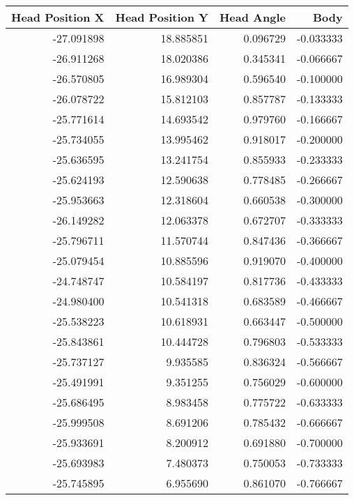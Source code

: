 \begin{tabular}{rrrr}
\toprule
 Head Position X &  Head Position Y &  Head Angle &       Body \\
\midrule
      -27.091898 &        18.885851 &    0.096729 &  -0.033333 \\
      -26.911268 &        18.020386 &    0.345341 &  -0.066667 \\
      -26.570805 &        16.989304 &    0.596540 &  -0.100000 \\
      -26.078722 &        15.812103 &    0.857787 &  -0.133333 \\
      -25.771614 &        14.693542 &    0.979760 &  -0.166667 \\
      -25.734055 &        13.995462 &    0.918017 &  -0.200000 \\
      -25.636595 &        13.241754 &    0.855933 &  -0.233333 \\
      -25.624193 &        12.590638 &    0.778485 &  -0.266667 \\
      -25.953663 &        12.318604 &    0.660538 &  -0.300000 \\
      -26.149282 &        12.063378 &    0.672707 &  -0.333333 \\
      -25.796711 &        11.570744 &    0.847436 &  -0.366667 \\
      -25.079454 &        10.885596 &    0.919070 &  -0.400000 \\
      -24.748747 &        10.584197 &    0.817736 &  -0.433333 \\
      -24.980400 &        10.541318 &    0.683589 &  -0.466667 \\
      -25.538223 &        10.618931 &    0.663447 &  -0.500000 \\
      -25.843861 &        10.444728 &    0.796803 &  -0.533333 \\
      -25.737127 &         9.935585 &    0.836324 &  -0.566667 \\
      -25.491991 &         9.351255 &    0.756029 &  -0.600000 \\
      -25.686495 &         8.983458 &    0.775722 &  -0.633333 \\
      -25.999508 &         8.691206 &    0.785432 &  -0.666667 \\
      -25.933691 &         8.200912 &    0.691880 &  -0.700000 \\
      -25.693983 &         7.480373 &    0.750053 &  -0.733333 \\
      -25.745895 &         6.955690 &    0.861070 &  -0.766667 \\

\end{tabular}
